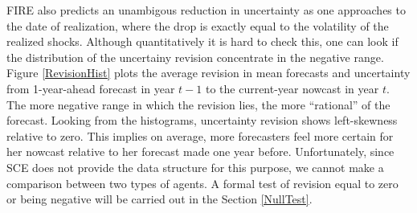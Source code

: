 \documentclass[]{article}
\begin{document}
FIRE also predicts an unambigous reduction in uncertainty as one approaches to the date of realization, where the drop is exactly equal to the volatility of the realized shocks. Although quantitatively it is hard to check this, one can look if the distribution of the uncertainy revision concentrate in the negative range. Figure \ref{RevisionHist} plots the average revision in mean forecasts and uncertainty from 1-year-ahead forecast in year $t-1$ to the current-year nowcast in year $t$. The more negative range in which the revision lies, the more ``rational'' of the forecast. Looking from the histograms, uncertainty revision shows left-skewness relative to zero. This implies on average,  more forecasters feel more certain for her nowcast relative to her forecast made one year before.  Unfortunately, since SCE does not provide the data structure for this purpose, we cannot make a comparison between two types of agents. A formal test of revision equal to zero or being negative will be carried out in the Section \ref{NullTest}. 
\end{document}
